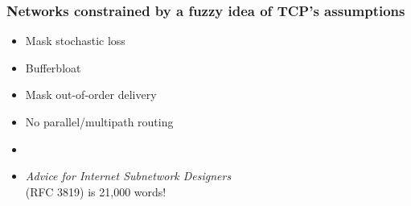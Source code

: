 \documentclass[svgnames]{beamer}
\begin{document}
%
%
%
%
%
%
%

\begin{frame}
\frametitle{Networks constrained by a fuzzy idea of TCP's assumptions}

\Large

\begin{itemize}
\item Mask stochastic loss
\item Bufferbloat
\item Mask out-of-order delivery
\item No parallel/multipath routing
\item[]
\item[] {\it Advice for Internet Subnetwork Designers}\\ (RFC 3819) is 21,000 words!
\end{itemize}

\end{frame}
\end{document}
